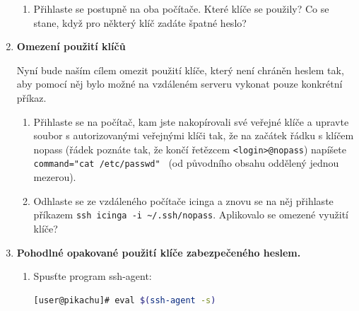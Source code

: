 \begin{enumerate}
\begin{enumerate}
    \item Přihlaste se postupně na oba počítače. Které klíče se použily? Co se stane, když
pro některý klíč zadáte špatné heslo?

    \end{enumerate}

  \item {\bf Omezení použití klíčů}

    Nyní bude naším cílem omezit použití klíče, který není chráněn heslem tak,
    aby pomocí něj bylo možné na vzdáleném serveru vykonat pouze konkrétní příkaz.

    \begin{enumerate}

      \item Přihlaste se na počítač, kam jste nakopírovali své veřejné klíče a
        upravte soubor s autorizovanými veřejnými klíči tak, že na začátek
        řádku s klíčem nopass (řádek poznáte tak, že končí řetězcem
        {\tt <login>@nopass}) napíšete
        \verb|command="cat /etc/passwd" | (od původního
        obsahu oddělený jednou mezerou).

      \item Odhlaste se ze vzdáleného počítače icinga a znovu se na něj přihlaste
        příkazem {\tt ssh icinga -i \textasciitilde/.ssh/nopass}. Aplikovalo se
        omezené využití klíče?

    \end{enumerate}


  \item {\bf Pohodlné opakované použití klíče zabezpečeného heslem.}

    \begin{enumerate}

      \item Spusťte program ssh-agent:
      \begin{lstlisting}[language=bash]
            [user@pikachu]# eval $(ssh-agent -s)
      \end{lstlisting}


\end{enumerate}
\end{enumerate}
